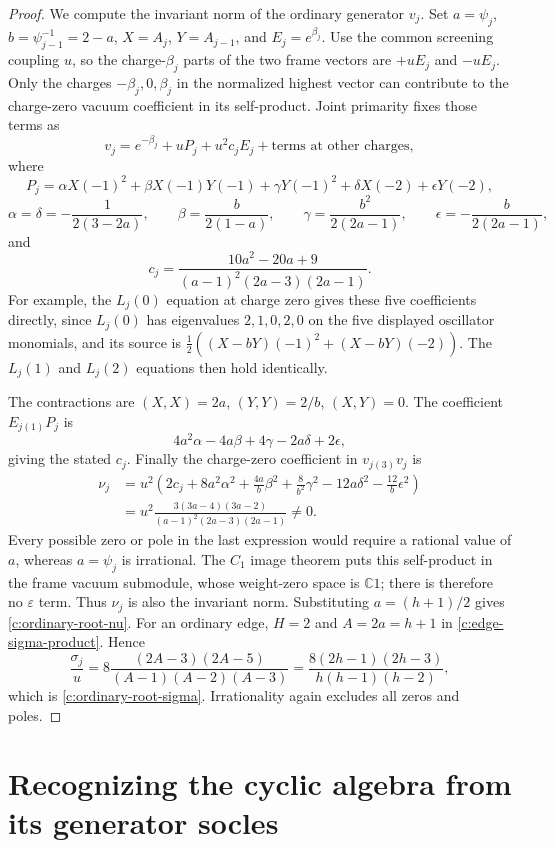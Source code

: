 \documentclass[11pt,a4paper]{article}
\numberwithin{equation}{section}
\theoremstyle{definition}\newtheorem{definition}[theorem]{Definition}
\theoremstyle{remark}\newtheorem{remark}[theorem]{Remark}
\begin{document}
\begin{proof}

We compute the invariant norm of the ordinary generator $v_j$.
Set $a=\psi_j$, $b=\psi_{j-1}^{-1}=2-a$,
$X=A_j$, $Y=A_{j-1}$, and $E_j=e^{\beta_j}$.
Use the common screening coupling $u$, so the charge-$\beta_j$ parts
of the two frame vectors are $+uE_j$ and $-uE_j$.
Only the charges $-\beta_j,0,\beta_j$ in the normalized highest vector
can contribute to the charge-zero vacuum coefficient in its
self-product.  Joint primarity fixes those terms as
\[
 v_j=e^{-\beta_j}+uP_j+u^2c_jE_j+
       \text{terms at other charges},
\]
where
\[
 P_j=\alpha X(-1)^2+\beta X(-1)Y(-1)+\gamma Y(-1)^2
                         +\delta X(-2)+\epsilon Y(-2),
\]
\[
 \alpha=\delta=-\frac1{2(3-2a)},\qquad
 \beta=\frac{b}{2(1-a)},\qquad
 \gamma=\frac{b^2}{2(2a-1)},\qquad
 \epsilon=-\frac{b}{2(2a-1)},
\]
and
\[
 c_j=\frac{10a^2-20a+9}{(a-1)^2(2a-3)(2a-1)}.
\]
For example, the $L_j(0)$ equation at charge zero gives these five
coefficients directly, since $L_j(0)$ has eigenvalues $2,1,0,2,0$
on the five displayed oscillator monomials, and its source is
$\tfrac12((X-bY)(-1)^2+(X-bY)(-2))$.
The $L_j(1)$ and $L_j(2)$ equations then hold identically.

The contractions are $(X,X)=2a$, $(Y,Y)=2/b$, $(X,Y)=0$.
The coefficient $E_{j(1)}P_j$ is
\[
 4a^2\alpha-4a\beta+4\gamma-2a\delta+2\epsilon,
\]
giving the stated $c_j$.  Finally the charge-zero coefficient in
$v_{j(3)}v_j$ is
\begin{align*}
 \nu_j&=u^2\left(2c_j+8a^2\alpha^2+
       \frac{4a}{b}\beta^2+\frac8{b^2}\gamma^2
       -12a\delta^2-\frac{12}{b}\epsilon^2\right)\\
 &=u^2\frac{3(3a-4)(3a-2)}{(a-1)^2(2a-3)(2a-1)}\ne0.
\end{align*}
Every possible zero or pole in the last expression would require a
rational value of $a$, whereas $a=\psi_j$ is irrational.
The $C_1$ image theorem puts this self-product in the frame vacuum
submodule, whose weight-zero space is $\mathbb C1$; there is therefore
no $\varepsilon$ term.  Thus $\nu_j$ is also the invariant norm.
Substituting $a=(h+1)/2$ gives \eqref{c:ordinary-root-nu}.
For an ordinary edge, $H=2$ and $A=2a=h+1$ in
\eqref{c:edge-sigma-product}. Hence
\[
 \frac{\sigma_j}{u}
 =8\frac{(2A-3)(2A-5)}{(A-1)(A-2)(A-3)}
 =\frac{8(2h-1)(2h-3)}{h(h-1)(h-2)},
\]
which is \eqref{c:ordinary-root-sigma}. Irrationality again excludes
all zeros and poles.
\end{proof}


\section{Recognizing the cyclic algebra from its generator socles}
\end{document}
